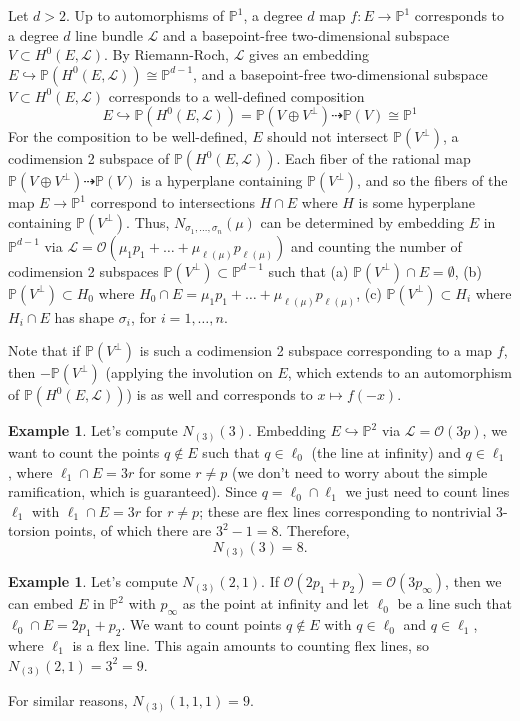 \documentclass[11pt]{article}           %
\renewcommand{\P}{\mathbb P}
\theoremstyle{definition}
\newtheorem{eg}[thm]{Example}
\begin{document}
Let $d>2$. Up to automorphisms of $\P^1$, a degree $d$ map $f:E\to\P^1$ corresponds to a degree $d$ line bundle $\mathcal L$ and a basepoint-free two-dimensional subspace $V\subset H^0(E,\mathcal L)$. By Riemann-Roch, $\mathcal L$ gives an embedding $E\hookrightarrow\P(H^0(E,\mathcal L))\cong\P^{d-1}$, and a basepoint-free two-dimensional subspace $V\subset H^0(E,\mathcal L)$ corresponds to a well-defined composition
\[
E\hookrightarrow \P(H^0(E,\mathcal L))=\P(V\oplus V^{\perp})\dashrightarrow\P(V)\cong\P^1
\]
For the composition to be well-defined, $E$ should not intersect $\P(V^{\perp})$, a codimension 2 subspace of $\P(H^0(E,\mathcal L))$. Each fiber of the rational map
$\P(V\oplus V^{\perp})\dashrightarrow\P(V)$ is a hyperplane containing $\P(V^{\perp})$, and so the fibers of the map $E\to\P^1$ correspond to intersections $H\cap E$ where $H$ is some hyperplane containing $\P(V^{\perp})$. Thus, $N_{\sigma_1,\dots,\sigma_n}(\mu)$ can be determined by embedding $E$ in $\P^{d-1}$ via $\mathcal L=\mathcal O(\mu_{1}p_1+\dots+\mu_{\ell(\mu)}p_{\ell(\mu)})$ and counting the number of codimension 2 subspaces $\P(V^{\perp})\subset \P^{d-1}$ such that (a) $\P(V^{\perp})\cap E=\emptyset$, (b) $\P(V^{\perp})\subset H_0$ where $H_0\cap E=\mu_{1}p_1+\dots+\mu_{\ell(\mu)}p_{\ell(\mu)}$, (c) $\P(V^{\perp})\subset H_i$ where $H_i\cap E$ has shape $\sigma_i$, for $i=1,\dots,n$.

Note that if $\P(V^{\perp})$ is such a codimension 2 subspace corresponding to a map $f$, then $-\P(V^{\perp})$ (applying the involution on $E$, which extends to an automorphism of $\P(H^0(E,\mathcal L))$) is as well and corresponds to $x\mapsto f(-x)$.

\begin{eg}
  Let's compute $N_{(3)}(3)$. Embedding $E\hookrightarrow\P^2$ via $\mathcal L=\mathcal O(3p)$, we want to count the points $q\notin E$ such that
  $q\in\ell_0$ (the line at infinity) and $q\in\ell_1$, where $\ell_1\cap E=3r$ for some $r\neq p$ (we don't need to worry about the simple ramification, which
  is guaranteed). Since $q=\ell_0\cap\ell_1$ we just need to count lines $\ell_1$ with $\ell_1\cap E=3r$ for $r\neq p$; these are flex lines corresponding to nontrivial 3-torsion points, of which there are $3^2-1=8$. Therefore,
  \[
  N_{(3)}(3)=8.
  \]
\end{eg}
\begin{eg}
  Let's compute $N_{(3)}(2,1)$. If $\mathcal O(2p_1+p_2)=\mathcal O(3p_{\infty})$, then we can embed $E$ in $\P^2$ with $p_{\infty}$ as the point at infinity
  and let $\ell_0$ be a line such that $\ell_0\cap E=2p_1+p_2$. We want to count points $q\notin E$ with $q\in \ell_0$ and $q\in \ell_1$, where $\ell_1$ is a flex line. This again amounts to counting flex lines, so $N_{(3)}(2,1)=3^2=9$.

  For similar reasons, $N_{(3)}(1,1,1)=9$.
\end{eg}
\end{document}
